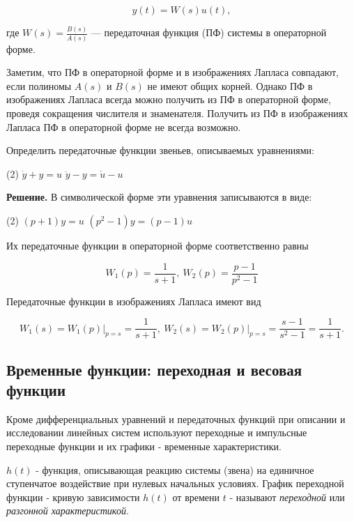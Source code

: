 \documentclass[../../TAU.tex]{subfiles}
\begin{document}
    \begin{equation}
        y(t) = W(s)u(t),
    \end{equation}
    
    где 
    $W(s) = \frac{B(s)}{A(s)}$ --- передаточная функция (ПФ) системы  в операторной форме.

    Заметим, что ПФ в операторной форме и в изображениях Лапласа совпадают, если полиномы $A(s)$ и $B(s)$ не имеют общих корней. Однако ПФ в изображениях Лапласа всегда можно получить из ПФ в операторной форме, проведя сокращения числителя и знаменателя. Получить из ПФ в изображениях Лапласа ПФ в операторной форме не всегда возможно.

    \examp Определить передаточные функции звеньев, описываемых уравнениями:
    
    \begin{tasks}(2)
        \task $\dot y + y = u$
        \task $\ddot y - y = \dot u - u$
    \end{tasks}
    {\bf Решение.}
    В символической форме эти уравнения записываются в виде:

    \begin{tasks}(2)
        \task $(p+1) y = u$
        \task $(p^2-1) y = (p-1) u$
    \end{tasks}

    Их передаточные функции в операторной форме соответственно равны

    $$
        W_1(p)=\frac{1}{s+1}, \ W_2(p)= \frac{p-1}{p^2-1}
    $$

    Передаточные функции в изображениях Лапласа имеют вид

    $$
        \left.W_1(s)=W_1(p)\right\vert_{p=s} = \frac{1}{s+1}, \ 
        \left.W_2(s)=W_2(p)\right\vert_{p=s} = \frac{s-1}{s^2-1} = \frac{1}{s+1}.
    $$

\subsection{Временные функции: переходная и весовая функции} %

    Кроме дифференциальных уравнений и передаточных функций при описании и исследовании линейных систем используют переходные и импульсные переходные функции и их графики - временные характеристики.

     $h(t)$  - функция, описывающая реакцию системы (звена) на единичное ступенчатое воздействие при нулевых начальных условиях. 
    График переходной функции - кривую зависимости $h(t)$ от времени $t$ - называют {\it переходной} или {\it разгонной характеристикой}.
\end{document}
